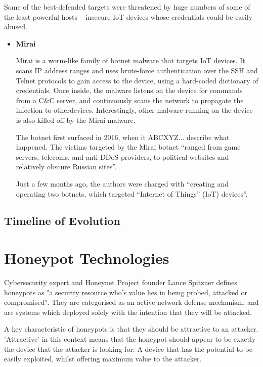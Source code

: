 Some of the best-defended targets were threatened by huge numbers of some of the least powerful hosts – insecure IoT devices whose credentials could be easily abused.

\begin{itemize}
	\item \textbf{Mirai}
	
	Mirai is a worm-like family of botnet malware that targets IoT devices. It scans IP address ranges and uses brute-force authentication over the SSH and Telnet protocols to gain access to the device, using a hard-coded dictionary of credentials. Once inside, the malware listens on the device for commands from a C&C server, and continuously scans the network to propagate the infection to otherdevices. Interestingly, other malware running on the device is also killed off by the Mirai malware. 
	
	The botnet first surfaced in 2016, when it {ABCXYZ... describe what happened}. The victims targeted by the Mirai botnet “ranged from game servers, telecoms, and anti-DDoS providers, to political websites and relatively obscure Russian sites”.
		
	Just a few months ago, the authors were charged with “creating and operating two botnets, which targeted “Internet of Things” (IoT) devices”.
\end{itemize}

\subsection{Timeline of Evolution}








\section{Honeypot Technologies}

Cybersecurity expert and Honeynet Project founder Lance Spitzner defines honeypots as "a security resource who's value lies in being probed, attacked or compromised". They are categorised as an active network defense mechanism, and are systems which deployed solely with the intention that they will be attacked. 

A key characteristic of honeypots is that they should be attractive to an attacker. 'Attractive' in this context means that the honeypot should appear to be exactly the device that the attacker is looking for: A device that has the potential to be easily exploited, whilst offering maximum value to the attacker.

